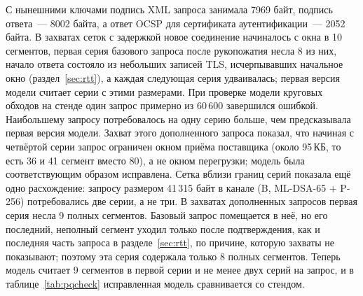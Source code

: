 \documentclass[conference,a4paper]{IEEEtran}
\newcommand{\newtext}[1]{{\color{blue}#1}}
\newcommand{\newgreen}[1]{{\color{green!50!black}#1}}
\newcommand{\newviolet}[1]{{\color{violet}#1}}
\begin{document}
{\newtext{С нынешними ключами подпись XML запроса занимала 7969 байт, подпись ответа~---
8002 байта, а ответ OCSP для сертификата аутентификации~--- 2052 байта. В захватах
сеток с задержкой новое соединение начиналось с окна в 10 сегментов,
первая серия \newgreen{базового} запроса после рукопожатия несла \newgreen{8} из них, начало ответа
состояло из небольших записей TLS, исчерпывавших начальное окно (раздел~\ref{sec:rtt}), а каждая
следующая серия удваивалась; \newgreen{первая версия} модели считает серии с этими размерами. При проверке модели круговых
обходов на стенде один запрос примерно из \newgreen{60\,600} завершился ошибкой. Наибольшему
запросу потребовалось на одну серию больше, чем предсказывала первая версия модели. Захват \newgreen{этого
дополненного запроса} показал, что
начиная с четвёртой серии запрос ограничен окном приёма поставщика (около
95\,КБ, то есть 36 и 41 сегмент вместо 80), а не окном перегрузки; модель была соответствующим образом
исправлена\newviolet{. Сетка вблизи границ серий показала ещё одно расхождение: запросу размером
41\,315 байт в канале (B, ML-DSA-65 + P-256) потребовались две серии, а не три. \newgreen{В
захватах дополненных запросов первая серия несла 9 полных сегментов. Базовый запрос помещается
в неё, но его последний, неполный сегмент уходил только после подтверждения, как и последняя часть
запроса в разделе~\ref{sec:rtt}, по причине, которую захваты не показывают; поэтому эта серия содержала только 8 полных
сегментов.} Теперь модель считает 9 сегментов в
первой серии и не менее двух серий на запрос}, и в таблице~\ref{tab:pqcheck}
исправленная модель сравнивается со стендом.}

}
\end{document}
